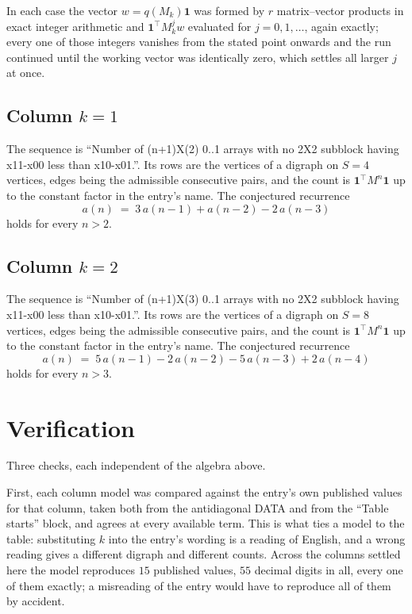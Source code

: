 \documentclass[11pt,a4paper]{article}
\theoremstyle{plain}
\theoremstyle{definition}
\begin{document}
In each case the vector $w=q(M_k)\mathbf{1}$ was formed by $r$ matrix--vector products in
exact integer arithmetic and $\mathbf{1}^{\!\top}M_k^{j}w$ evaluated for $j=0,1,\dots$,
again exactly; every one of those integers vanishes from the stated point onwards and the run
continued until the working vector was identically zero, which settles all larger $j$ at once.

\subsection*{Column $k=1$}
The sequence is ``Number of (n+1)X(2) 0..1 arrays with no 2X2 subblock having x11-x00 less than x10-x01.''. Its rows are the vertices of a digraph on
$S=4$ vertices, edges being the admissible consecutive pairs, and the count is
$\mathbf{1}^{\!\top}M^{n}\mathbf{1}$ up to the constant factor in the entry's name.
The conjectured recurrence
\[
a(n)\;=\;3\,a(n-1) + a(n-2) - 2\,a(n-3)
\]
holds for every $n>2$.

\subsection*{Column $k=2$}
The sequence is ``Number of (n+1)X(3) 0..1 arrays with no 2X2 subblock having x11-x00 less than x10-x01.''. Its rows are the vertices of a digraph on
$S=8$ vertices, edges being the admissible consecutive pairs, and the count is
$\mathbf{1}^{\!\top}M^{n}\mathbf{1}$ up to the constant factor in the entry's name.
The conjectured recurrence
\[
a(n)\;=\;5\,a(n-1) - 2\,a(n-2) - 5\,a(n-3) + 2\,a(n-4)
\]
holds for every $n>3$.

\section{Verification}

Three checks, each independent of the algebra above.

First, each column model was compared against the entry's own published values for that
column, taken both from the antidiagonal DATA and from the ``Table starts'' block, and agrees
at every available term. This is what ties a model to the table: substituting $k$ into the
entry's wording is a reading of English, and a wrong reading gives a different digraph and
different counts. Across the columns settled here the model reproduces $15$ published
values, $55$ decimal digits in all, every one of them exactly; a misreading of the entry
would have to reproduce all of them by accident.
\end{document}
